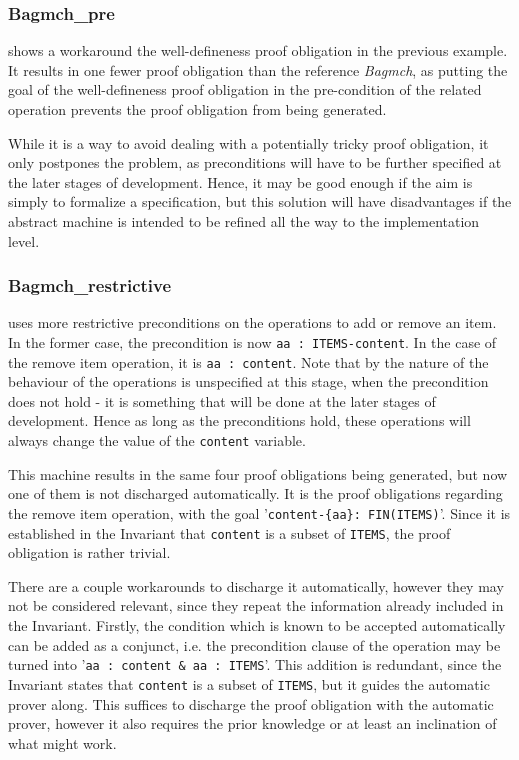 \documentclass[11pt,journal]{IEEEtran}
\begin{document}
	\subsubsection{Bagmch\_pre} shows a workaround the well-defineness proof obligation in the previous example. It results in one fewer proof obligation than the reference \emph{Bagmch}, as putting the goal of the well-defineness proof obligation in the pre-condition of the related operation prevents the proof obligation from being generated.
	
	While it is a way to avoid dealing with a potentially tricky proof obligation, it only postpones the problem, as preconditions will have to be further specified at the later stages of development. Hence, it may be good enough if the aim is simply to formalize a specification, but this solution will have disadvantages if the abstract machine is intended to be refined all the way to the implementation level. 
	
	\subsubsection{Bagmch\_restrictive} uses more restrictive preconditions on the operations to add or remove an item. In the former case, the precondition is now \texttt{aa : ITEMS-content}. In the case of the remove item operation, it is \texttt{aa : content}. Note that by the nature of the behaviour of the operations is unspecified at this stage, when the precondition does not hold - it is something that will be done at the later stages of development. Hence as long as the preconditions hold, these operations will always change the value of the \texttt{content} variable.
	
	This machine results in the same four proof obligations being generated, but now one of them is not discharged automatically. It is the proof obligations regarding the remove item operation, with the goal '\texttt{content-\{aa\}: FIN(ITEMS)}'. Since it is established in the Invariant that \texttt{content} is a subset of \texttt{ITEMS}, the proof obligation is rather trivial. 
	
	There are a couple workarounds to discharge it automatically, however they may not be considered relevant, since they repeat the information already included in the Invariant. Firstly, the condition which is known to be accepted automatically can be added as a conjunct, i.e. the precondition clause of the operation may be turned into '\texttt{aa : content \& aa : ITEMS}'. This addition is redundant, since the Invariant states that \texttt{content} is a subset of \texttt{ITEMS}, but it guides the automatic prover along. This suffices to discharge the proof obligation with the automatic prover, however it also requires the prior knowledge or at least an inclination of what might work.
	
\end{document}
